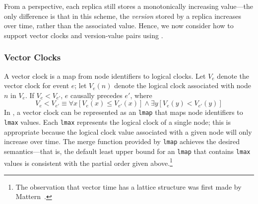 From a \lang perspective, each replica still stores a monotonically increasing
value---the only difference is that in this scheme, the \emph{version} stored by
a replica increases over time, rather than the associated value. Hence, we now
consider how to support vector clocks and version-value pairs using \lang.

\subsubsection{Vector Clocks}
A vector clock is a map from node identifiers to logical clocks. Let $V_e$
denote the vector clock for event $e$; let $V_e(n)$ denote the logical clock
associated with node $n$ in $V_e$. If $V_e < V_{e'}$, $e$ causally precedes
$e'$, where
\begin{displaymath}
V_e < V_{e'} \equiv \forall x [ V_e(x) \leq V_{e'}(x) ] \land \exists y [ V_e(y) < V_{e'}(y) ]  
\end{displaymath}
In \lang, a vector clock can be represented as an \texttt{lmap} that maps node
identifiers to \texttt{lmax} values. Each \texttt{lmax} represents the logical
clock of a single node; this is appropriate because the logical clock value
associated with a given node will only increase over time. The merge function
provided by \texttt{lmap} achieves the desired semantics---that is, the default
least upper bound for an \texttt{lmap} that contains \texttt{lmax} values is
consistent with the partial order given above.\footnote{The observation that
  vector time has a lattice structure was first made by
  Mattern~\cite{Mattern1989}.}

